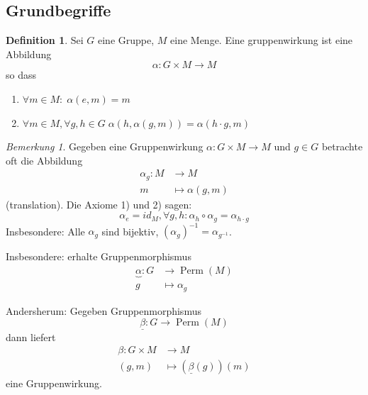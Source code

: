 \documentclass[12pt,parskip=full]{scrartcl}
\theoremstyle{definition}
\newtheorem{definition}[theorem]{Definition}
\theoremstyle{remark}
\newtheorem*{remark}{Bemerkung}
\begin{document}
	\subsection{Grundbegriffe}
	
	\begin{definition}
		Sei $G$ eine Gruppe, $M$ eine Menge. Eine gruppenwirkung ist eine Abbildung
		\begin{equation*}
			\alpha: G \times M \to M
		\end{equation*}
		so dass
		\begin{enumerate}
			\item $\forall m \in M: \; \alpha(e,m) = m$
			\item $\forall m \in M, \forall g,h \in G \; \alpha(h, \alpha(g,m)) = \alpha(h \cdot g, m)$
		\end{enumerate}
	\end{definition}

	\begin{remark}
		Gegeben eine Gruppenwirkung $\alpha: G \times M \to M$ und $g \in G$ betrachte oft die Abbildung
		\begin{align*}
			\alpha_g: M &\longrightarrow M\\
			m &\longmapsto \alpha(g,m)
		\end{align*}
		(translation). Die Axiome 1) und 2) sagen:
		\begin{equation*}
			\alpha_e = id_M, \forall g,h: \alpha_h \circ \alpha_g = \alpha_{h \cdot g}
		\end{equation*}
		Insbesondere: Alle $\alpha_g$ sind bijektiv, $(\alpha_g)^{-1} = \alpha_{g^{-1}}$.
		
		Insbesondere: erhalte Gruppenmorphismus
		\begin{align*}
			\underbrace{\alpha}: G &\longrightarrow \operatorname{Perm}(M) \\
			g &\longmapsto \alpha_g
		\end{align*}
		
		Andersherum: Gegeben Gruppenmorphismus
		\begin{equation*}
			\underline{\beta}: G \to \operatorname{Perm}(M)
		\end{equation*}
		dann liefert
		\begin{align*}
			\beta: G \times M &\longrightarrow M \\
			(g,m) &\longmapsto (\underline{\beta}(g))(m)
		\end{align*}
		eine Gruppenwirkung.
	\end{remark}
\end{document}
